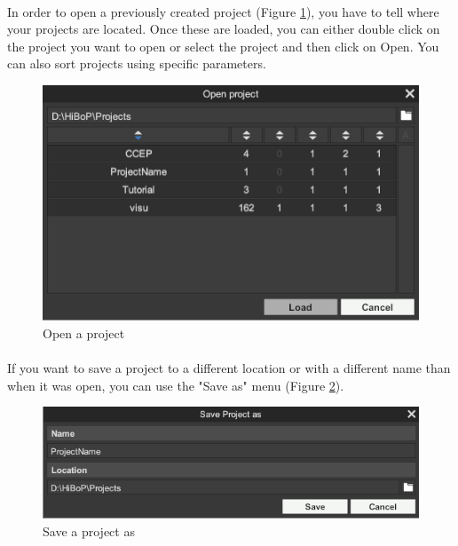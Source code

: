 \documentclass[a4paper]{article}
\begin{document}
\paragraph{} In order to open a previously created project (Figure \ref{openProjectUI}), you have to tell where your projects are located. Once these are loaded, you can either double click on the project you want to open or select the project and then click on Open. You can also sort projects using specific parameters.
\begin{figure}[H]
\begin{center}
\includegraphics[scale=0.5]{OpenProject.png}
\end{center}
\caption{\label{openProjectUI}Open a project}
\end{figure}
\paragraph{} If you want to save a project to a different location or with a different name than when it was open, you can use the "Save as" menu (Figure \ref{saveProjectUI}).
\begin{figure}[H]
\begin{center}
\includegraphics[scale=0.5]{SaveAs.png}
\end{center}
\caption{\label{saveProjectUI}Save a project as}
\end{figure}
\end{document}
